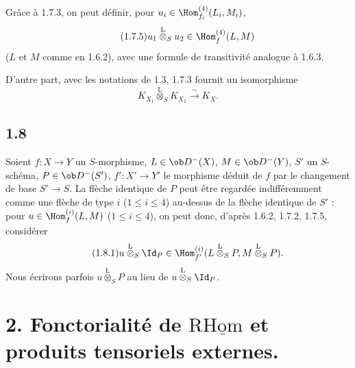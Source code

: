 Grâce à 1.7.3, on peut définir, pour $u_i\in\Hom_{f_i}^{(4)}(L_i,M_i)$,
\begin{equation}\tag{1.7.5}
u_1\overset{\mathrm{L}}{\otimes}_{S}u_2\in\Hom_f^{(4)}(L,M)
\end{equation}
($L$ et $M$ comme en 1.6.2), avec une formule de transitivité analogue à 1.6.3.

D'autre part, avec les notations de 1.3, 1.7.3 fournit un isomorphisme
\begin{equation}\tag{1.7.6}
K_{X_1}\overset{\mathrm{L}}{\otimes}_{S}K_{X_2}\xrightarrow{\sim}K_X.
\end{equation}

\subsection*{1.8}
Soient $f:X\to Y$ un $S$-morphisme, $L\in\ob D^{-}(X)$, $M\in\ob D^{-}(Y)$, $S'$ un $S$-schéma, $P\in\ob D^{-}(S')$, $f':X'\to Y'$ le morphisme déduit de $f$ par le changement de base $S'\to S$. La flèche identique de $P$ peut être regardée indifféremment comme une flèche de type $i$ ($1\leq i\leq4$) au-dessus de la flèche identique de $S'$ : pour $u\in\Hom_f^{(i)}(L,M)$ ($1\leq i\leq4$), on peut donc, d'après 1.6.2, 1.7.2, 1.7.5, considérer
\begin{equation}\tag{1.8.1}
u\overset{\mathrm{L}}{\otimes}_{S}\Id_P\in\Hom_{f'}^{(i)}(L\overset{\mathrm{L}}{\otimes}_{S}P,M\overset{\mathrm{L}}{\otimes}_{S}P).
\end{equation}
Nous écrirons parfois $u\overset{\mathrm{L}}{\otimes}_{S}P$ au lieu de $u\overset{\mathrm{L}}{\otimes}_{S}\Id_P$.

\section*{2. Fonctorialité de \texorpdfstring{$\mathrm{R}\underline{\mathrm{Hom}}$}{RHom} et produits tensoriels externes.}

